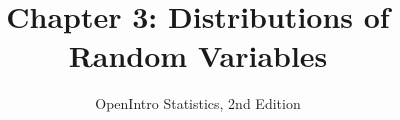 \documentclass[slidestop,compress,mathserif]{beamer}
\title[Chp 3: Distributions of RVs]{Chapter 3: Distributions of Random Variables}
\author{OpenIntro Statistics, 2nd Edition}
\date{}
\institute{}
\begin{document}


\begin{frame}[plain]

\titlepage

\end{frame}








\end{document}
